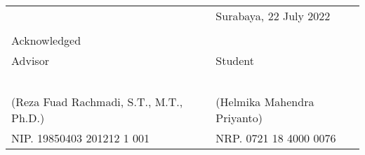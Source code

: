 \noindent\begin{tabularx}{\textwidth}{X l}
  & Surabaya, 22 July 2022\\
  & \\
  Acknowledged & \\
  Advisor & Student\\
  & \\
  & \\
  & \\
  & \\
  & \\
  (Reza Fuad Rachmadi, S.T., M.T., Ph.D.) & (Helmika Mahendra Priyanto) \\
  NIP. 19850403 201212 1 001  & NRP. 0721 18 4000 0076 \\
\end{tabularx}